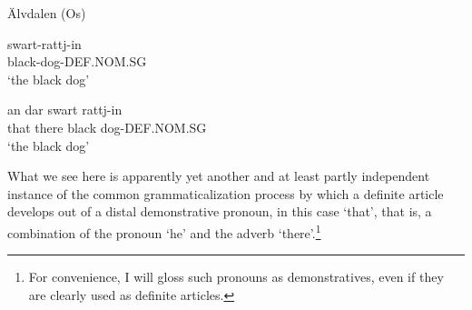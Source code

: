 
\item 

\label{bkm:Ref155154659}Älvdalen (Os)



\item 


 \ea\label{}
\gll swart-rattj-in\\


black-dog-DEF.NOM.SG\\

\glt ‘the black dog’

\z

\item 


 \ea\label{}
\gll an  dar  swart  rattj-in\\


that  there  black  dog-DEF.NOM.SG\\

\glt ‘the black dog’

\z

What we see here is apparently yet another and at least partly independent instance of the common grammaticalization process by which a definite article develops out of a distal demonstrative pronoun, in this case  ‘that’, that is, a combination of the pronoun  ‘he’ and the adverb  ‘there’.\footnote{ For convenience, I will gloss such pronouns as demonstratives, even if they are clearly used as definite articles.} 


